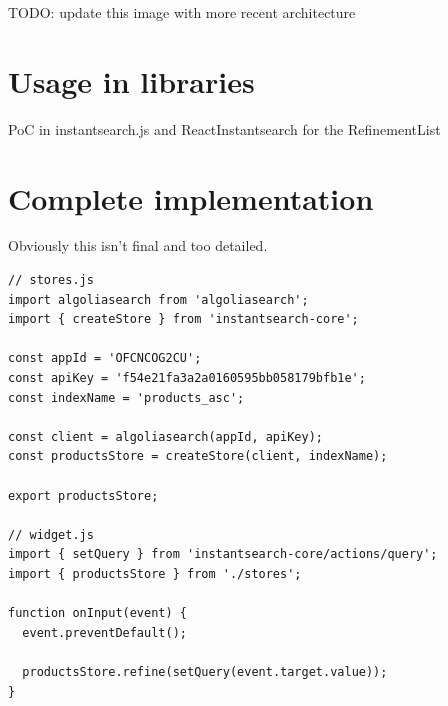TODO: update this image with more recent architecture %


\section{Usage in libraries} %
\label{sec:usage_in_libraries}

PoC in instantsearch.js and ReactInstantsearch for the RefinementList %


\section{Complete implementation} %
\label{sec:complete_implementation}

Obviously this isn't final and too detailed. %

\begin{lstlisting}[caption={Using instantsearch-core},label={lst:is-core-usage}]
// stores.js
import algoliasearch from 'algoliasearch';
import { createStore } from 'instantsearch-core';

const appId = 'OFCNCOG2CU';
const apiKey = 'f54e21fa3a2a0160595bb058179bfb1e';
const indexName = 'products_asc';

const client = algoliasearch(appId, apiKey);
const productsStore = createStore(client, indexName);

export productsStore;

// widget.js
import { setQuery } from 'instantsearch-core/actions/query';
import { productsStore } from './stores';

function onInput(event) {
  event.preventDefault();

  productsStore.refine(setQuery(event.target.value));
}
\end{lstlisting}


